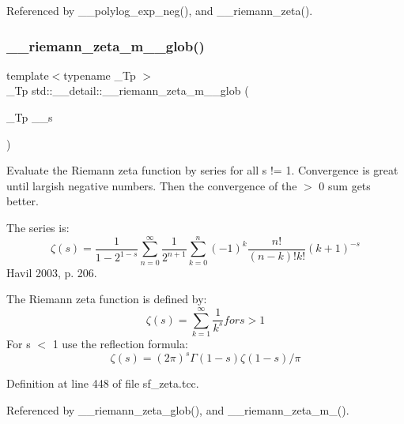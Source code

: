Referenced by \+\_\+\+\_\+polylog\+\_\+exp\+\_\+neg(), and \+\_\+\+\_\+riemann\+\_\+zeta().

\mbox{\label{namespacestd_1_1____detail_ac7a15aa2658fef76642cebd7858fa0ff}} 
\subsubsection{\texorpdfstring{\+\_\+\+\_\+riemann\+\_\+zeta\+\_\+m\+\_\+\_\+glob()}{\_\_riemann\_zeta\_m\_1\_glob()}}
{\footnotesize\ttfamily template$<$typename \+\_\+\+Tp $>$ \\
\+\_\+\+Tp std\+::\+\_\+\+\_\+detail\+::\+\_\+\+\_\+riemann\+\_\+zeta\+\_\+m\+\_\+\_\+glob (\begin{DoxyParamCaption}\item[{\+\_\+\+Tp}]{\+\_\+\+\_\+s }\end{DoxyParamCaption})}



Evaluate the Riemann zeta function by series for all s != 1. Convergence is great until largish negative numbers. Then the convergence of the $>$ 0 sum gets better. 

The series is\+: \[ \zeta(s) = \frac{1}{1-2^{1-s}} \sum_{n=0}^{\infty} \frac{1}{2^{n+1}} \sum_{k=0}^{n} (-1)^k \frac{n!}{(n-k)!k!} (k+1)^{-s} \] Havil 2003, p. 206.

The Riemann zeta function is defined by\+: \[ \zeta(s) = \sum_{k=1}^{\infty} \frac{1}{k^{s}} for s > 1 \] For s $<$ 1 use the reflection formula\+: \[ \zeta(s) = (2\pi)^s \Gamma(1-s) \zeta(1-s) / \pi \] 

Definition at line 448 of file sf\+\_\+zeta.\+tcc.



Referenced by \+\_\+\+\_\+riemann\+\_\+zeta\+\_\+glob(), and \+\_\+\+\_\+riemann\+\_\+zeta\+\_\+m\+\_().

\mbox{\label{namespacestd_1_1____detail_a917935f42a21af90b78a19ea81349129}} 
